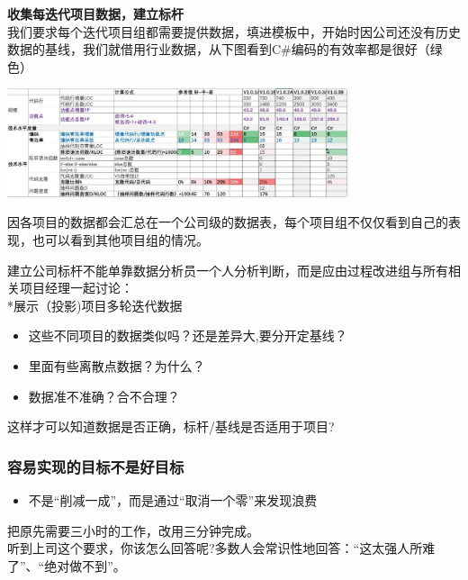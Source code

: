 \textbf{收集每迭代项目数据，建立标杆}\\
我们要求每个迭代项目组都需要提供数据，填进模板中，开始时因公司还没有历史数据的基线，我们就借用行业数据，从下图看到C\#编码的有效率都是很好（绿色）


\includegraphics[width=10cm]{陈爱明p15.jpg}

因各项目的数据都会汇总在一个公司级的数据表，每个项目组不仅仅看到自己的表现，也可以看到其他项目组的情况。

建立公司标杆不能单靠数据分析员一个人分析判断，而是应由过程改进组与所有相关项目经理一起讨论：\\
*展示（投影)项目多轮迭代数据

\begin{itemize}
\tightlist
\item
  这些不同项目的数据类似吗？还是差异大,要分开定基线？
\item
  里面有些离散点数据？为什么？
\item
  数据准不准确？合不合理？
\end{itemize}

这样才可以知道数据是否正确，标杆/基线是否适用于项目?

\hypertarget{ux5bb9ux6613ux5b9eux73b0ux7684ux76eeux6807ux4e0dux662fux597dux76eeux6807}{%
\subsubsection{容易实现的目标不是好目标}\label{ux5bb9ux6613ux5b9eux73b0ux7684ux76eeux6807ux4e0dux662fux597dux76eeux6807}}

\begin{itemize}
\tightlist
\item
  不是``削减一成''，而是通过``取消一个零''来发现浪费
\end{itemize}

把原先需要三小时的工作，改用三分钟完成。\\
听到上司这个要求，你该怎么回答呢?多数人会常识性地回答：``这太强人所难了''、``绝对做不到''。\\

